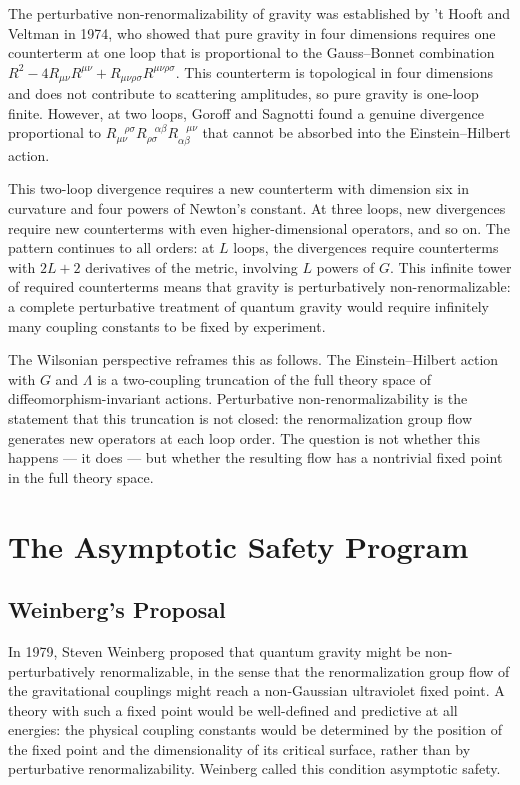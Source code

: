 \documentclass[11pt, twoside, openright]{book}
\theoremstyle{dotted}
\theoremstyle{definition}
\begin{document}
The perturbative non-renormalizability of gravity was established by 't Hooft and
Veltman in 1974, who showed that pure gravity in four dimensions requires one
counterterm at one loop that is proportional to the Gauss--Bonnet combination
$R^2 - 4R_{\mu\nu}R^{\mu\nu} + R_{\mu\nu\rho\sigma}R^{\mu\nu\rho\sigma}$. This
counterterm is topological in four dimensions and does not contribute to scattering
amplitudes, so pure gravity is one-loop finite. However, at two loops, Goroff and
Sagnotti found a genuine divergence proportional to $R_{\mu\nu}^{\;\;\;\rho\sigma}
R_{\rho\sigma}^{\;\;\;\alpha\beta}R_{\alpha\beta}^{\;\;\;\mu\nu}$ that cannot be
absorbed into the Einstein--Hilbert action.

This two-loop divergence requires a new counterterm with dimension six in curvature
and four powers of Newton's constant. At three loops, new divergences require new
counterterms with even higher-dimensional operators, and so on. The pattern
continues to all orders: at $L$ loops, the divergences require counterterms with
$2L + 2$ derivatives of the metric, involving $L$ powers of $G$. This infinite
tower of required counterterms means that gravity is perturbatively
non-renormalizable: a complete perturbative treatment of quantum gravity would
require infinitely many coupling constants to be fixed by experiment.

The Wilsonian perspective reframes this as follows. The Einstein--Hilbert action
with $G$ and $\Lambda$ is a two-coupling truncation of the full theory space of
diffeomorphism-invariant actions. Perturbative non-renormalizability is the
statement that this truncation is not closed: the renormalization group flow
generates new operators at each loop order. The question is not whether this happens
--- it does --- but whether the resulting flow has a nontrivial fixed point in the
full theory space.

\chapter{The Asymptotic Safety Program}
\label{ch:asymptotic_safety}

\section{Weinberg's Proposal}

In 1979, Steven Weinberg proposed that quantum gravity might be non-perturbatively
renormalizable, in the sense that the renormalization group flow of the gravitational
couplings might reach a non-Gaussian ultraviolet fixed point. A theory with such a
fixed point would be well-defined and predictive at all energies: the physical
coupling constants would be determined by the position of the fixed point and the
dimensionality of its critical surface, rather than by perturbative renormalizability.
Weinberg called this condition asymptotic safety.
\end{document}
